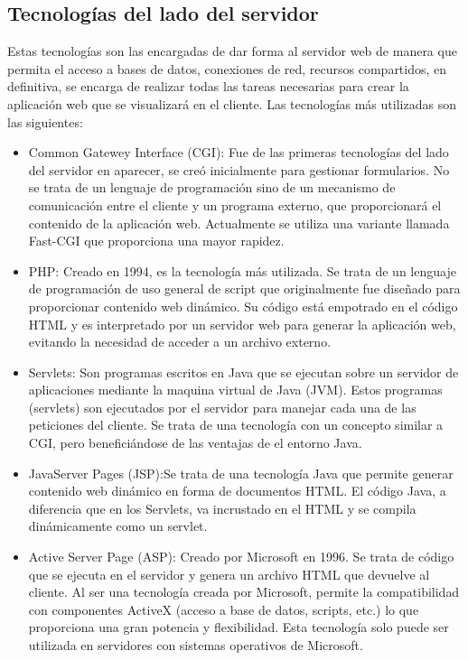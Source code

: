 \subsection{Tecnologías del lado del servidor}
Estas tecnologías son las encargadas de dar forma al servidor web de manera que permita el acceso a bases de datos, conexiones de red, recursos compartidos, en definitiva, se encarga de realizar todas las tareas necesarias para crear la aplicación web que se visualizará en el cliente. Las tecnologías más utilizadas son las siguientes:
\begin{itemize}
	\item Common Gatewey Interface (CGI): Fue de las primeras tecnologías del lado del servidor en aparecer, se creó inicialmente para gestionar formularios. No se trata de un lenguaje de programación sino  de un mecanismo de comunicación entre el cliente y un programa externo, que proporcionará el contenido de la aplicación web. Actualmente se utiliza una variante llamada Fast-CGI que proporciona una mayor rapidez.
	\item PHP: Creado en 1994, es la tecnología más utilizada. Se trata de un lenguaje de programación de uso general de script que originalmente fue diseñado para proporcionar contenido web dinámico. Su código está empotrado en el código HTML y es interpretado por un servidor web para generar la aplicación web, evitando la necesidad de acceder a un archivo externo.
	\item Servlets: Son programas escritos en Java que se ejecutan sobre un servidor de aplicaciones mediante la maquina virtual de Java (JVM). Estos programas (servlets) son ejecutados por el servidor para manejar cada una de las peticiones del cliente. Se trata de una tecnología con un concepto similar a CGI, pero beneficiándose de las ventajas de el entorno Java.
	\item JavaServer Pages (JSP):Se trata de una tecnología Java que permite generar contenido web dinámico en forma de documentos HTML. El código Java, a diferencia que en los Servlets, va incrustado en el HTML y se compila dinámicamente como un servlet.
	\item Active Server Page (ASP): Creado por Microsoft en 1996. Se trata de código que se ejecuta en el servidor y genera un archivo HTML que devuelve al cliente. Al ser una tecnología creada por Microsoft, permite la compatibilidad con componentes ActiveX (acceso a base de datos, scripts, etc.) lo que proporciona una gran potencia y flexibilidad. Esta tecnología solo puede ser utilizada en servidores con sistemas operativos de Microsoft.

\end{itemize}
